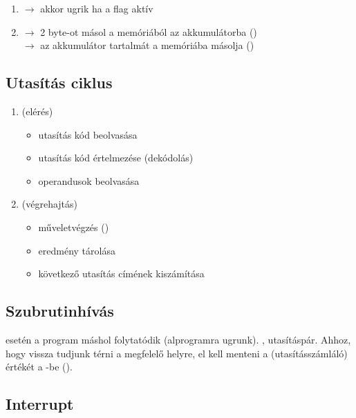 \documentclass[../main.tex]{subfiles}
\begin{document}
\begin{itemize}
\begin{enumerate}
          \item {} $\rightarrow$
                akkor ugrik ha a  flag aktív

          \item {} $\rightarrow$
                2 byte-ot másol a memóriából az akkumulátorba
                ()
                \\
                 $\rightarrow$
                az akkumulátor tartalmát a memóriába másolja
                ()
        \end{enumerate}
\end{itemize}

\subsection{Utasítás ciklus}

\begin{enumerate}
  \item {} (elérés)
        \begin{itemize}
          \item utasítás kód beolvasása
          \item utasítás kód értelmezése (dekódolás)
          \item operandusok beolvasása
        \end{itemize}
  \item {} (végrehajtás)
        \begin{itemize}
          \item műveletvégzés ()
          \item eredmény tárolása
          \item következő utasítás címének kiszámítása
        \end{itemize}
\end{enumerate}

\subsection{Szubrutinhívás}

 esetén a program máshol folytatódik (alprogramra ugrunk).
,  utasításpár. Ahhoz, hogy vissza tudjunk térni a megfelelő
helyre, el kell menteni a  (utasításszámláló) értékét a -be
().

\subsection{Interrupt}
\end{document}
